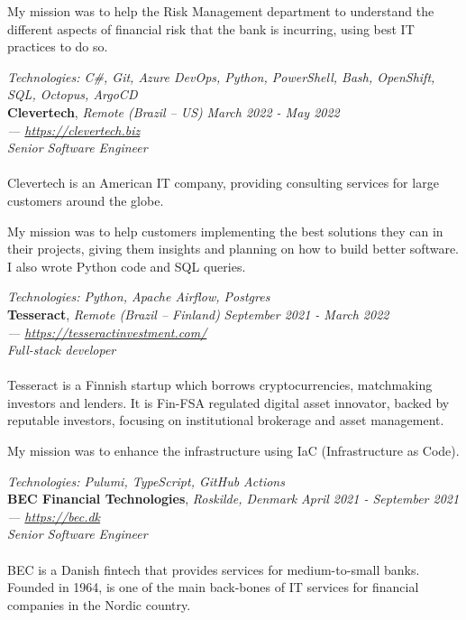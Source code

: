 \documentclass[margin]{res} %
\begin{document}
\begin{resume}
		My mission was to help the Risk Management department to understand the different aspects of financial risk that the bank is incurring, using best IT practices to do so.

		{\sl Technologies: C\#, Git, Azure DevOps, Python, PowerShell, Bash, OpenShift, SQL, Octopus, ArgoCD }\\

		{\bf Clevertech}, {\sl Remote (Brazil -- US)} \hfill {\sl March 2022 - May 2022} \\
		{\sl — \href{https://clevertech.biz}{https://clevertech.biz}} \\
		{\sl Senior Software Engineer} \\
		\\
		Clevertech is an American IT company, providing consulting services for large customers around the globe.

		My mission was to help customers implementing the best solutions they can in their projects, giving them insights and planning on how to build better software. I also wrote Python code and SQL queries.

		{\sl Technologies: Python, Apache Airflow, Postgres} \\

		{\bf Tesseract}, {\sl Remote (Brazil -- Finland)} \hfill {\sl September 2021 - March 2022} \\
		{\sl — \href{https://tesseractinvestment.com/}{https://tesseractinvestment.com/}} \\
		{\sl Full-stack developer} \\
		\\
		Tesseract is a Finnish startup which borrows cryptocurrencies, matchmaking investors and lenders. It is Fin-FSA regulated digital asset innovator, backed by reputable investors, focusing on institutional brokerage and asset management.

		My mission was to enhance the infrastructure using IaC (Infrastructure as Code).

		{\sl Technologies: Pulumi, TypeScript, GitHub Actions} \\

		{\bf BEC Financial Technologies}, {\sl Roskilde, Denmark} \hfill {\sl April 2021 - September 2021} \\
		{\sl — \href{https://bec.dk}{https://bec.dk}} \\
		{\sl Senior Software Engineer} \\
		\\
		BEC is a Danish fintech that provides services for medium-to-small banks. Founded in 1964, is one of the main back-bones of IT services for financial companies in the Nordic country.


\end{resume}
\end{document}
